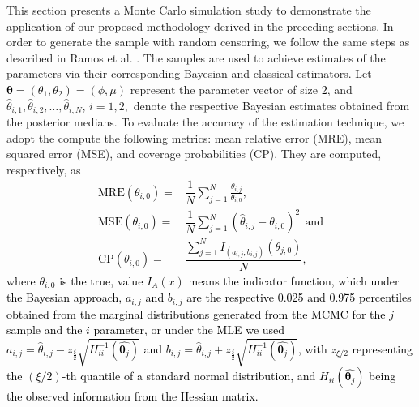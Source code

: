 \documentclass[]{interact}
\theoremstyle{plain}%
\theoremstyle{definition}
\theoremstyle{remark}
\begin{document}
This section presents a Monte Carlo simulation study to demonstrate the application of our proposed methodology derived in the preceding sections. In order to generate the sample with random censoring, we follow the same steps as described in Ramos et al. \cite{ramos2020sampling}. The samples are used to achieve estimates of the parameters via their corresponding Bayesian and classical estimators. Let \textcolor{black}{$\boldsymbol\theta=(\theta_1,\theta_2)=(\phi,\mu) $} represent the parameter vector of size \textcolor{black}{2}, and $\hat\theta_{i,1},\hat\theta_{i,2},\ldots,\hat\theta_{i,N}$, $i=1,2,$ denote the respective Bayesian estimates obtained from the posterior medians. To evaluate the accuracy of the estimation technique, we adopt the compute the following metrics: mean relative error (MRE), mean squared error (MSE), and coverage probabilities (CP). They are computed, respectively, as
\textcolor{black}{
\begin{align*}%
\text{MRE}(\theta_{i,0}) =& \dfrac{1}{N}\sum_{j=1}^{N}\frac{\hat\theta_{i,j}}{\theta_{i,0}}, \\ \text{MSE}(\theta_{i,0}) =& \dfrac{1}{N}\sum_{j=1}^{N}\left(\hat\theta_{i,j}-\theta_{i,0}\right)^2  \ \ \text{and}  \\ 
\text{CP}(\theta_{i,0})=&\dfrac{\sum_{j=1}^{N} I_{(a_{i,j},b_{i,j})}\left(\theta_{j,0}\right)}{N}, 
\end{align*}}
\textcolor{black}{where $\theta_{i,0}$ is the true, value $I_{A}(x)$ means the indicator function, which under the Bayesian approach, $a_{i,j}$ and $b_{i,j}$ are the respective 0.025 and 0.975 percentiles obtained from the marginal distributions generated from the MCMC for the $j$ sample and the $i$ parameter, or under the MLE we used $a_{i,j}=\hat{\theta}_{i,j} - z_{\frac{\xi}{2}}\sqrt{H^{-1}_{ii}(\hat{\boldsymbol{\theta}_j})}$ and $b_{i,j}=\hat{\theta}_{i,j} + z_{\frac{\xi}{2}}\sqrt{H^{-1}_{ii}(\hat{\boldsymbol{\theta}_j})}$, with $z_{\xi/2}$ representing the $\left(\xi/2\right)$-th quantile of a standard normal distribution, and $H_{ii}(\hat{\boldsymbol{\theta}_j})$ being the observed information from the Hessian matrix.}
\end{document}
